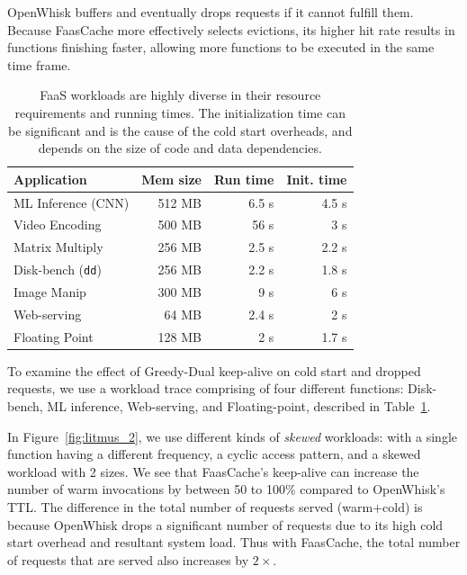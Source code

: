 OpenWhisk buffers and eventually drops requests if it cannot fulfill them.
Because FaasCache more effectively selects evictions, its higher hit rate results in functions finishing faster, allowing more functions to be executed in the same time frame.  
%
\begin{table}
  \centering
  \caption{FaaS workloads are highly diverse in their resource requirements and running times. The initialization time can be significant and is the cause of the cold start overheads, and depends on the size of code and data dependencies.}
  \begin{tabular}{lrrr}
    \hline 
    Application & Mem size & Run time & Init. time \\
    \hline
    ML Inference (CNN) & 512 MB & 6.5 s & 4.5 s \\
    Video Encoding & 500 MB & 56 s & 3 s \\
    Matrix Multiply & 256 MB & 2.5 s & 2.2 s \\
    Disk-bench (\texttt{dd})  & 256 MB & 2.2 s & 1.8 s \\
    Image Manip & 300 MB & 9 s & 6 s \\
    Web-serving & 64 MB & 2.4 s & 2 s \\
    Floating Point & 128 MB & 2 s & 1.7 s \\
    \hline
  \end{tabular}
  \label{tab:fc:workloads}
\end{table}

To examine the effect of Greedy-Dual keep-alive on cold start and dropped requests, we use a workload trace comprising of four different functions: Disk-bench, ML inference, Web-serving, and Floating-point, described in Table~\ref{tab:fc:workloads}.

In Figure~\ref{fig:litmus_2}, we use different kinds of \emph{skewed} workloads: with a single function having a different frequency, a cyclic access pattern, and a skewed workload with 2 sizes. 
We see that FaasCache's keep-alive can increase the number of warm invocations by between 50 to 100\% compared to OpenWhisk's TTL.
The difference in the total number of requests served (warm+cold) is because OpenWhisk drops a significant number of requests due to its high cold start overhead and resultant system load. 
%
Thus with FaasCache, the total number of requests that are served also increases by $2\times$. 

